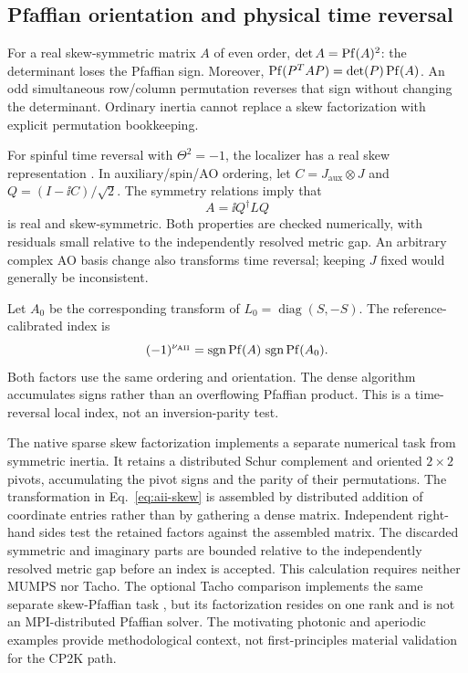 \subsection{Pfaffian orientation and physical time reversal}
For a real skew-symmetric matrix $A$ of even order,
$\det A=\operatorname{Pf}(A)^2$: the determinant loses the Pfaffian sign.
Moreover, $\operatorname{Pf}(P^TAP)=\det(P)\operatorname{Pf}(A)$.
An odd simultaneous row/column permutation reverses that sign
without changing the determinant.
Ordinary inertia cannot replace a skew factorization with explicit
permutation bookkeeping.

For spinful time reversal with $\Theta^2=-1$, the localizer has
a real skew representation \cite{DollSchulzBaldes2021,Wong2026}.
In auxiliary/spin/AO ordering, let $C=J_{\mathrm{aux}}\otimes J$
and $Q=(I-\ii C)/\sqrt2$. The symmetry relations imply that
\begin{equation}
 A=\ii Q^\dagger LQ
 \label{eq:aii-skew}
\end{equation}
is real and skew-symmetric. Both properties are checked numerically,
with residuals small relative to the independently resolved metric
gap. An arbitrary complex AO basis change also transforms time
reversal; keeping $J$ fixed would generally be inconsistent.

Let $A_0$ be the corresponding transform of
$L_0=\operatorname{diag}(S,-S)$. The reference-calibrated index is
\begin{equation}
 (-1)^{\nu_{\mathrm{AII}}}
 =\operatorname{sgn}\operatorname{Pf}(A)\,
  \operatorname{sgn}\operatorname{Pf}(A_0).
 \label{eq:pfaffian-index}
\end{equation}
Both factors use the same ordering and orientation.
The dense algorithm accumulates signs rather than an overflowing
Pfaffian product. This is a time-reversal local index,
not an inversion-parity test.

The native sparse skew factorization implements a separate numerical
task from symmetric inertia. It retains a distributed Schur complement
and oriented $2\times2$ pivots, accumulating the pivot signs and the
parity of their permutations. The transformation in
Eq.~\eqref{eq:aii-skew} is assembled by distributed addition of
coordinate entries rather than by gathering a dense matrix.
Independent right-hand sides test the retained factors against the
assembled matrix. The discarded symmetric and imaginary parts are
bounded relative to the independently resolved metric gap before
an index is accepted. This calculation requires neither MUMPS nor
Tacho. The optional Tacho comparison implements the same separate
skew-Pfaffian task \cite{Wong2026}, but its factorization resides on
one rank and is not an MPI-distributed Pfaffian solver.
The motivating photonic and aperiodic examples
\cite{Dixon2023,Wong2026} provide methodological context, not
first-principles material validation for the CP2K path.


